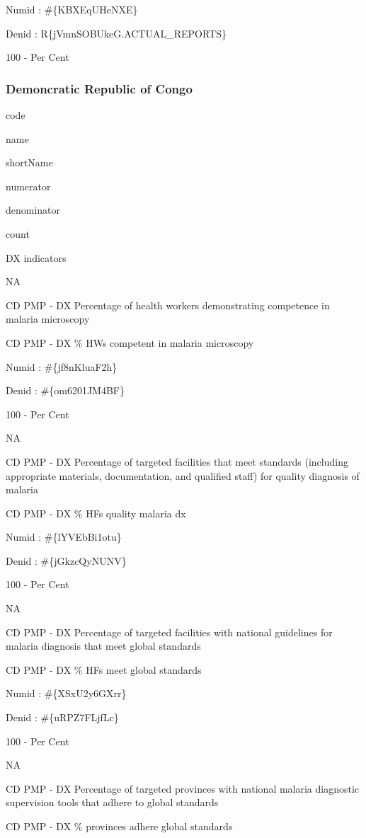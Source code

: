 \documentclass[]{book}
\begin{document}
Numid : \#\{KBXEqUHeNXE\}

Denid : R\{jVmnSOBUkeG.ACTUAL\_REPORTS\}

100 - Per Cent

\hypertarget{demoncratic-republic-of-congo}{%
\subsubsection{Demoncratic Republic of Congo}\label{demoncratic-republic-of-congo}}

code

name

shortName

numerator

denominator

count

DX indicators

NA

CD PMP - DX Percentage of health workers demonstrating competence in malaria microscopy

CD PMP - DX \% HWs competent in malaria microscopy

Numid : \#\{jf8nKluaF2h\}

Denid : \#\{om6201JM4BF\}

100 - Per Cent

NA

CD PMP - DX Percentage of targeted facilities that meet standards (including appropriate materials, documentation, and qualified staff) for quality diagnosis of malaria

CD PMP - DX \% HFs quality malaria dx

Numid : \#\{lYVEbBi1otu\}

Denid : \#\{jGkzcQyNUNV\}

100 - Per Cent

NA

CD PMP - DX Percentage of targeted facilities with national guidelines for malaria diagnosis that meet global standards

CD PMP - DX \% HFs meet global standards

Numid : \#\{XSxU2y6GXrr\}

Denid : \#\{uRPZ7FLjfLc\}

100 - Per Cent

NA

CD PMP - DX Percentage of targeted provinces with national malaria diagnostic supervision tools that adhere to global standards

CD PMP - DX \% provinces adhere global standards
\end{document}
